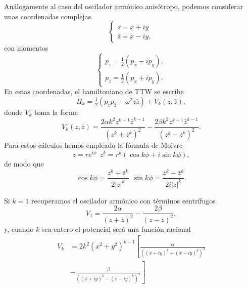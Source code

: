 \documentclass[12pt,a4paper,twocolumn,reqno]{amsart}
\theoremstyle{definition} \newtheorem{defn}[thm]{Definición}
\theoremstyle{definition} \newtheorem{ejemplo}[thm]{Ejemplo}
\theoremstyle{definition} \newtheorem{ejercicio}[thm]{Ejercicio}
\theoremstyle{remark} \newtheorem*{obs}{Observación}
\def\zz{\bar{z}}
\begin{document}
Análogamente al caso del oscilador armónico anisótropo, podemos considerar unas coordenadas complejas 
\begin{equation*}
  \begin{cases}
    z=x+iy \\
    \bar{z}=x-iy,
  \end{cases}
\end{equation*}
con momentos
\begin{equation*}
  \begin{cases}
    p_z=\tfrac{1}{2}(p_x-ip_y),\\
    p_{\zz}=\tfrac{1}{2}(p_x+ip_y).
  \end{cases}
\end{equation*}
En estas coordenadas, el hamiltoniano de TTW se escribe
\begin{equation*}
  H_k=\tfrac{1}{2}(p_zp_{\zz}+\omega^2 z \zz) + V_k(z,\zz),
\end{equation*}
donde $V_k$ toma la forma
\begin{equation}
  V_k(z,\zz)=\frac{2\alpha k^2 z^{k-1}\zz^{k-1}}{(z^k+\zz^k)^2}-\frac{2\beta k^2 z^{k-1}\zz^{k-1}}{(z^k-\zz^k)^2}.
\end{equation}
Para estos cálculos hemos empleado la fórmula de Moivre
\begin{equation*}
  z=re^{i\phi} \ \ z^k=r^k(\cos k\phi+i\sin k\phi),
\end{equation*}
de modo que 
\begin{equation*}
  \cos k\phi = \frac{z^k+\zz^k}{2|z|^k} \ \  \sin k\phi = \frac{z^k-\zz^k}{2i|z|^k}. 
\end{equation*}

Si $k=1$ recuperamos el oscilador armónico con términos centrífugos
\begin{equation*}
  V_1=\frac{2\alpha}{(z+\zz)^2}-\frac{2\beta}{(z-\zz)^2},
\end{equation*}
y, cuando $k$ sea entero el potencial será una función racional
\begin{align*}
  V_k&=2k^2(x^2+y^2)^{k-1}\left[ \frac{\alpha}{\left( (x+iy)^k+(x-iy)^k \right)^2}\right.\\ &\left.-\frac{\beta}{\left( (x+iy)^k-(x-iy)^k \right)^2} \right]
\end{align*}
\end{document}
